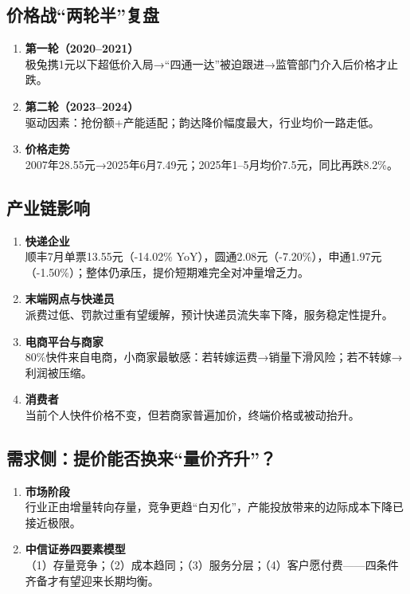 \subsection{价格战“两轮半”复盘}
\begin{enumerate}[leftmargin=*, nosep]
  \item \textbf{第一轮（2020–2021）}  \\
  极兔携1元以下超低价入局→“四通一达”被迫跟进→监管部门介入后价格才止跌。
  \item \textbf{第二轮（2023–2024）}  \\
  驱动因素：抢份额+产能适配；韵达降价幅度最大，行业均价一路走低。
  \item \textbf{价格走势}  \\
  2007年28.55元→2025年6月7.49元；2025年1–5月均价7.5元，同比再跌8.2\%。
\end{enumerate}

\subsection{产业链影响}
\begin{enumerate}[leftmargin=*, nosep]
  \item \textbf{快递企业}  \\
  顺丰7月单票13.55元（-14.02\% YoY），圆通2.08元（-7.20\%），申通1.97元（-1.50\%）；整体仍承压，提价短期难完全对冲量增乏力。
  \item \textbf{末端网点与快递员}  \\
  派费过低、罚款过重有望缓解，预计快递员流失率下降，服务稳定性提升。
  \item \textbf{电商平台与商家}  \\
  80\%快件来自电商，小商家最敏感：若转嫁运费→销量下滑风险；若不转嫁→利润被压缩。
  \item \textbf{消费者}  \\
  当前个人快件价格不变，但若商家普遍加价，终端价格或被动抬升。
\end{enumerate}

\subsection{需求侧：提价能否换来“量价齐升”？}
\begin{enumerate}[leftmargin=*, nosep]
  \item \textbf{市场阶段}  \\
  行业正由增量转向存量，竞争更趋“白刃化”，产能投放带来的边际成本下降已接近极限。
  \item \textbf{中信证券四要素模型}  \\
  （1）存量竞争；（2）成本趋同；（3）服务分层；（4）客户愿付费——四条件齐备才有望迎来长期均衡。
\end{enumerate}

